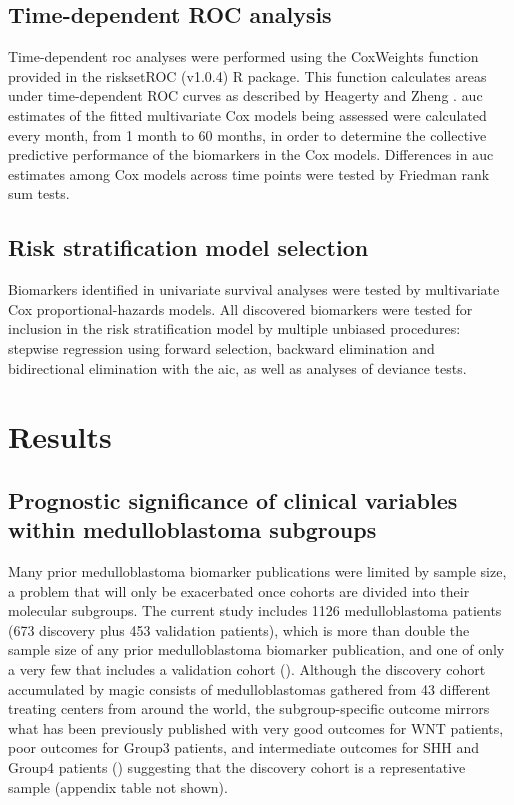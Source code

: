 \subsection{Time-dependent ROC analysis}

Time-dependent \gls{roc} analyses were performed using the CoxWeights function provided in the risksetROC (v1.0.4) R package. This function calculates areas under time-dependent ROC curves as described by Heagerty and Zheng . \gls{auc} estimates of the fitted multivariate Cox models being assessed were calculated every month, from 1 month to 60 months, in order to determine the collective predictive performance of the biomarkers in the Cox models. Differences in \gls{auc} estimates among Cox models across time points were tested by Friedman rank sum tests.

\subsection{Risk stratification model selection}

Biomarkers identified in univariate survival analyses were tested by multivariate Cox proportional-hazards models. All discovered biomarkers were tested for inclusion in the risk stratification model by multiple unbiased procedures: stepwise regression using forward selection, backward elimination and bidirectional elimination with the \gls{aic}, as well as analyses of deviance tests.


\section{Results}

\subsection{Prognostic significance of clinical variables within medulloblastoma subgroups}

Many prior medulloblastoma biomarker publications were limited by sample size, a problem that will only be exacerbated once cohorts are divided into their molecular subgroups. The current study includes 1126 medulloblastoma patients (673 discovery plus 453 validation patients), which is more than double the sample size of any prior medulloblastoma biomarker publication, and one of only a very few that includes a validation cohort (). Although the discovery cohort accumulated by \gls{magic} consists of medulloblastomas gathered from 43 different treating centers from around the world, the subgroup-specific outcome mirrors what has been previously published with very good outcomes for WNT patients, poor outcomes for Group3 patients, and intermediate outcomes for SHH and Group4 patients () suggesting that the discovery cohort is a representative sample (appendix table not shown).

